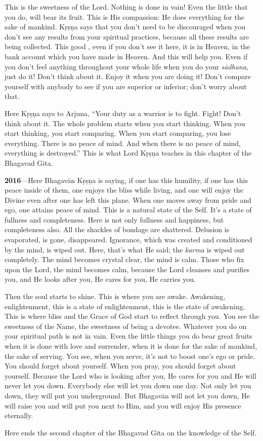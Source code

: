 This is the sweetness of the Lord. Nothing is done in vain! Even the little that you do, will bear its fruit. This is His compassion: He does everything for the sake of mankind. Kṛṣṇa says that you don’t need to be discouraged when you don’t see any results from your spiritual practices, because all these results are being collected. This good , even if you don’t see it here, it is in Heaven, in the bank account which you have made in Heaven. And this will help you. Even if you don’t feel anything throughout your whole life when you do your \textit{sādhana}, just do it! Don’t think about it. Enjoy it when you are doing it! Don’t compare yourself with anybody to see if you are superior or inferior; don’t worry about that.

Here Kṛṣṇa says to Arjuna, “Your duty as a warrior is to fight. Fight! Don’t think about it. The whole problem starts when you start thinking. When you start thinking, you start comparing. When you start comparing, you lose everything. There is no peace of mind. And when there is no peace of mind, everything is destroyed.” This is what Lord Kṛṣṇa teaches in this chapter of the Bhagavad Gita.

\textbf{2016}---Here Bhagavān Kṛṣṇa is saying, if one has this humility, if one has this peace inside of them, one enjoys the bliss while living, and one will enjoy the Divine even after one has left this plane. When one moves away from pride and ego, one attains peace of mind. This is a natural state of the Self. It’s a state of fullness and completeness. Here is not only fullness and happiness, but completeness also. All the shackles of bondage are shattered. Delusion is evaporated, is gone, disappeared. Ignorance, which was created and conditioned by the mind, is wiped out. Here, that’s what He said; the \textit{karma} is wiped out completely. The mind becomes crystal clear, the mind is calm. Those who fix upon the Lord, the mind becomes calm, because the Lord cleanses and purifies you, and He looks after you, He cares for you, He carries you.

Then the soul starts to shine. This is where you are awake. Awakening, enlightenment, this is a state of enlightenment, this is the state of awakening. This is where bliss and the Grace of God start to reflect through you. You see the sweetness of the Name, the sweetness of being a devotee. Whatever you do on your spiritual path is not in vain. Even the little things you do bear great fruits when it is done with love and surrender, when it is done for the sake of mankind, the sake of serving. You see, when you serve, it’s not to boost one’s ego or pride. You should forget about yourself. When you pray, you should forget about yourself. Because the Lord who is looking after you, He cares for you and He will never let you down. Everybody else will let you down one day. Not only let you down, they will put you underground. But Bhagavān will not let you down, He will raise you and will put you next to Him, and you will enjoy His presence eternally.

Here ends the second chapter of the Bhagavad Gita on the knowledge of the Self.